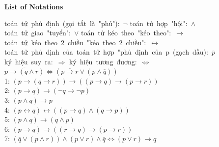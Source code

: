 \documentclass{article}
\begin{document}
\begin{titlingpage}
\begin{center}
\textbf{List of Notations}
\end{center}
\hbox{toán tử phủ định (gọi tắt là "phủ"): $\neg$\\}
\hbox{toán tử hợp "hội": $\wedge$\\}
\hbox{toán tử giao "tuyển": $\vee$\\}
\hbox{toán tử kéo theo "kéo theo": $\rightarrow$\\}
\hbox{toán tử kéo theo 2 chiều "kéo theo 2 chiều": $\leftrightarrow$\\}
\hbox{toán tử phủ định của toán tử hợp "phủ định của p (gạch đầu): $\overline{p}$\\}
\hbox{ký hiệu suy ra: $\Rightarrow$\\}
\hbox{ký hiệu tương đương: $\Leftrightarrow$\\}
$\overline{p\rightarrow(q\wedge r)}\Leftrightarrow(\overline{p\rightarrow r}\vee(p\wedge\overline{q}))$ \\
1: 
$(p\rightarrow(q\rightarrow r))\rightarrow((p\rightarrow q)\rightarrow(p\rightarrow r))$ \\
2: 
$(p\rightarrow q)\rightarrow(\neg q\rightarrow \neg p)$ \\
3: 
$(p\land q)\rightarrow p$ \\
4: 
$(p\leftrightarrow q)\leftrightarrow((p\rightarrow q)\land(q\rightarrow p))$ \\
5: 
$(p\land q)\rightarrow(q\land p)$ \\
6: 
$(p\rightarrow q)\rightarrow((r\rightarrow q)\rightarrow(p\rightarrow r))$ \\
7:
$(\overline{q}\vee(p\wedge r))\wedge(p\vee r)\wedge\overline{q}\Leftrightarrow\overline{(p\vee r)\rightarrow q}$ \\


\end{titlingpage}
\end{document}
